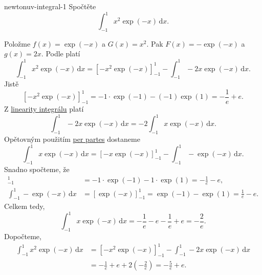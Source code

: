 \begin{problem}{}{newtonuv-integral-1}
 Spočtěte
 \[
  \int_{-1}^{1} x^2 \exp(-x) \, \mathrm{d}x.
 \]
\end{problem}
\begin{probsol}
 Položme $f(x) = \exp(-x)$ a $G(x) = x^2$. Pak $F(x) = -\exp(-x)$ a $g(x) = 2x$.
 Podle  platí
 \[
  \int_{-1}^{1} x^2 \exp(-x) \, \mathrm{d}x = [-x^2 \exp(-x)]_{-1}^{1} -
  \int_{-1}^{1} -2x \exp(-x) \, \mathrm{d}x.
 \]
 Jistě
 \[
  [-x^2 \exp(-x)]_{-1}^{1} = -1 \cdot \exp(-1) - (-1)\exp(1) = -\frac{1}{e} + e.
 \]
 Z \hyperref[thm:linearita-newtonova-integralu]{linearity integrálu} platí
 \[
  \int_{-1}^{1} -2x \exp(-x) \, \mathrm{d}x = -2 \int_{-1}^{1} x \exp(-x) \,
  \mathrm{d}x.
 \]
 Opětovným použitím \hyperref[thm:per-partes-pro-newtonuv-integral]{per partes}
 dostaneme
 \[
  \int_{-1}^{1} x \exp(-x) \, \mathrm{d}x = [-x \exp(-x)]_{-1}^{1} -
  \int_{-1}^{1} -\exp(-x) \, \mathrm{d}x.
 \]
 Snadno spočteme, že
 \begin{align*}
  [-x \exp(-x)]_{-1}^{1} &= -1 \cdot \exp(-1) - 1 \cdot \exp(1) = -\frac{1}{e} -
  e,\\
  \int_{-1}^{1} -\exp(-x) \, \mathrm{d}x &= [\exp(-x)]_{-1}^{1} = \exp(-1) -
  \exp(1) = \frac{1}{e} - e.
 \end{align*}
 Celkem tedy,
 \[
  \int_{-1}^{1} x\exp(-x) \, \mathrm{d}x = -\frac{1}{e} - e - \frac{1}{e} + e =
  -\frac{2}{e}.
 \]
 Dopočteme,
 \begin{align*}
  \int_{-1}^{1} x^2\exp(-x) \, \mathrm{d}x 
  &= [-x^2 \exp(-x)]_{-1}^{1} - \int_{-1}^{1} -2x \exp(-x) \, \mathrm{d}x\\
  &= -\frac{1}{e} + e + 2 \left( -\frac{2}{e} \right) = -\frac{5}{e} + e.
 \end{align*}
\end{probsol}

